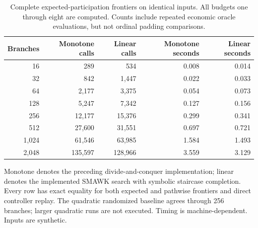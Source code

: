 \begin{table}[htbp]\centering
\caption{Complete expected-participation frontiers on identical inputs. All budgets one through eight are computed. Counts include repeated economic oracle evaluations, but not ordinal padding comparisons.}\label{tab:r36-scale}
\begin{tabular}{rrrrr}\toprule
Branches & Monotone calls & Linear calls & Monotone seconds & Linear seconds\\\midrule
16 & 289 & 534 & 0.008 & 0.014\\
32 & 842 & 1,447 & 0.022 & 0.033\\
64 & 2,177 & 3,375 & 0.054 & 0.073\\
128 & 5,247 & 7,342 & 0.127 & 0.156\\
256 & 12,177 & 15,376 & 0.299 & 0.341\\
512 & 27,600 & 31,551 & 0.697 & 0.721\\
1,024 & 61,546 & 63,985 & 1.584 & 1.493\\
2,048 & 135,597 & 128,966 & 3.559 & 3.129\\
\bottomrule\end{tabular}
\par\smallskip\begin{minipage}{.97\textwidth}\small Monotone denotes the preceding divide-and-conquer implementation; linear denotes the implemented SMAWK search with symbolic staircase completion. Every row has exact equality for both expected and pathwise frontiers and direct controller replay. The quadratic randomized baseline agrees through 256 branches; larger quadratic runs are not executed. Timing is machine-dependent. Inputs are synthetic.\end{minipage}
\end{table}
